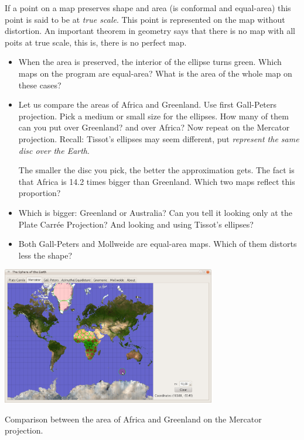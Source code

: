 \documentclass[a4paper,12pt]{article}
\begin{document}
If a point on a map preserves shape and area (is conformal and equal-area) this point is said to be at \emph{true scale}. This point is
represented on the map without distortion. An important theorem in geometry says that there is no map with all poits at true scale, this
is, there is no perfect map.

\begin{itemize}
 \item When the area is preserved, the interior of the ellipse turns green. Which maps on the program are equal-area? What is the area of
the whole map on these cases?
 
 \item Let us compare the areas of Africa and Greenland. Use first Gall-Peters projection. Pick a medium or small size for the ellipses.
How many of them can you put over Greenland? and over Africa? Now repeat on the Mercator projection. Recall: Tissot's ellipses may seem
different, put \emph{represent the same disc over the Earth}. 

  The smaller the disc you pick, the better the approximation gets. The fact is that Africa is 14.2 times bigger than Greenland. Which
two maps reflect this proportion?

 \item Which is bigger: Greenland or Australia? Can you tell it looking only at the Plate Carrée Projection? And looking and using Tissot's
ellipses?

 \item Both Gall-Peters and Mollweide are equal-area maps. Which of them distorts less the shape? 


\end{itemize}



 \begin{center}
  \includegraphics[width=0.7\textwidth]{../common/merc1.png} 
  
{Comparison between the area of Africa and Greenland on the Mercator projection.}
 \end{center}
\end{document}
